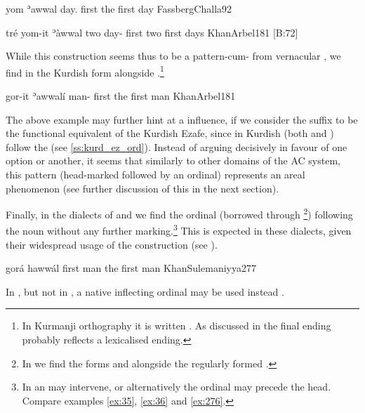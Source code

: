 {yom ʾawwal}
{day.\cst{} first}
{the first day}
{FassbergChalla}{92}



{tré\cb{} yom-it ʾàwwal}
{two\cb{} day-\cst{} first}
{two first days}
{KhanArbel}{181 {[B:72]}}


While this construction seems thus to be a pattern-cum- from vernacular , we find in \JArb the Kurdish \Kur form   alongside  \citep[cf.][181]{KhanArbel}.\footnote{In Kurmanji orthography it is written . As discussed in  the final  ending probably reflects a lexicalised \Kur \obl* ending.}  

{gor-it ʾawwalí}
{man-\cst{} first}
{the first man}
{KhanArbel}{181}

The above example may further hint at a \Kur influence, if we consider the \ed suffix to be the functional  equivalent of the Kurdish Ezafe, since in Kurdish (both \Kur and \Sor)  follow the \ez* (see \ref{ss:kurd_ez_ord}). Instead of arguing decisively in favour of one option or another, it seems that similarly to  other domains of the AC system, this pattern (head-marked \prim followed by an ordinal) represents an areal phenomenon (see further discussion of this in the next section).
 
 Finally, in the dialects of \JSul and \JSan we find the  ordinal  (borrowed through \Sor {}\footnote{In \Sor we find the forms  and  \citep[48]{HakemSorani} alongside the regularly formed  \citep[18]{ThackstonSorani}.}) following the noun without any further marking.\footnote{In \JSan an \ez* may intervene, or alternatively  the ordinal may precede the head. Compare examples \vref{ex:35}, \vref{ex:36} and \vref{ex:276}.} This is expected in these dialects, given their widespread usage of the  construction (see ).
 
 {gorá hawwál}
 {first man}
 {the first man}
 {KhanSulemaniyya}{277}
 
 In \JSul, but not in \JSan, a native inflecting ordinal  may be used instead \citep[206]{KhanSulemaniyya}.
 
